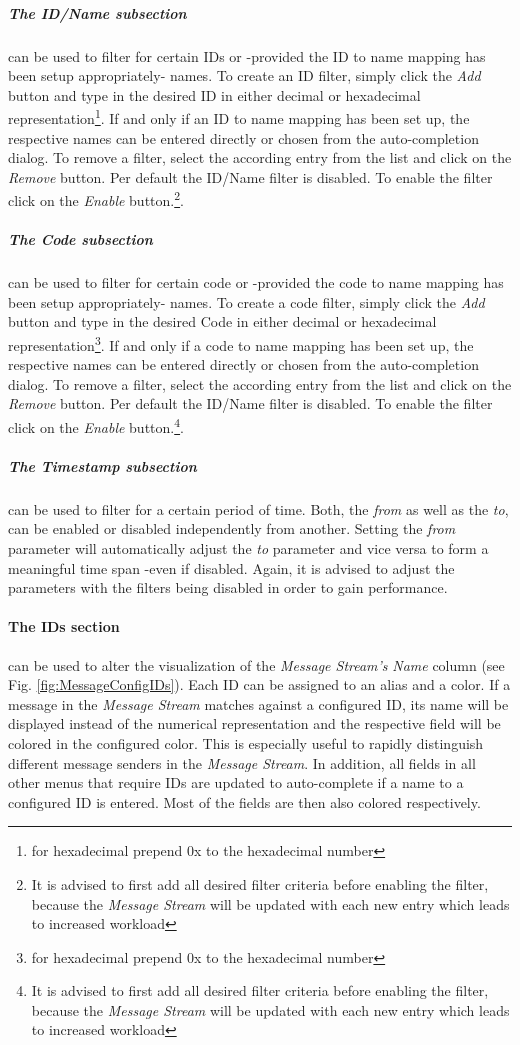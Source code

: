 \documentclass[12pt,a4paper]{scrartcl}
\begin{document}
\subparagraph{The ID/Name subsection} can be used to filter for certain IDs or -provided the ID to name mapping has been setup appropriately- names. To create an ID filter, simply click the \textit{Add} button and type in the desired ID in either decimal or hexadecimal representation\footnote{for hexadecimal prepend 0x to the hexadecimal number}. If and only if an ID to name mapping has been set up, the respective names can be entered directly or chosen from the auto-completion dialog. To remove a filter, select the according entry from the list and click on the \textit{Remove} button. Per default the ID/Name filter is disabled. To enable the filter click on the \textit{Enable} button.\footnote{It is advised to first add all desired filter criteria before enabling the filter, because the \textit{Message Stream} will be updated with each new entry which leads to increased workload}.

\subparagraph{The Code subsection} can be used to filter for certain code or -provided the code to name mapping has been setup appropriately- names. To create a code filter, simply click the \textit{Add} button and type in the desired Code in either decimal or hexadecimal representation\footnote{for hexadecimal prepend 0x to the hexadecimal number}. If and only if a code to name mapping has been set up, the respective names can be entered directly or chosen from the auto-completion dialog. To remove a filter, select the according entry from the list and click on the \textit{Remove} button. Per default the ID/Name filter is disabled. To enable the filter click on the \textit{Enable} button.\footnote{It is advised to first add all desired filter criteria before enabling the filter, because the \textit{Message Stream} will be updated with each new entry which leads to increased workload}.

\subparagraph{The Timestamp subsection} can be used to filter for a certain period of time. Both, the \textit{from} as well as the \textit{to}, can be enabled or disabled independently from another. Setting the \textit{from} parameter will automatically adjust the \textit{to} parameter and vice versa to form a meaningful time span -even if disabled. Again, it is advised to adjust the parameters with the filters being disabled in order to gain performance.

\paragraph{The IDs section} can be used to alter the visualization of the \textit{Message Stream's} \textit{Name} column (see Fig. \ref{fig:MessageConfigIDs}). Each ID can be assigned to an alias and a color. If a message in the \textit{Message Stream} matches against a configured ID, its name will be displayed instead of the numerical representation and the respective field will be colored in the configured color. This is especially useful to rapidly distinguish different message senders in the \textit{Message Stream}. In addition, all fields in all other menus that require IDs are updated to auto-complete if a name to a configured ID is entered. Most of the fields are then also colored respectively.
\end{document}
